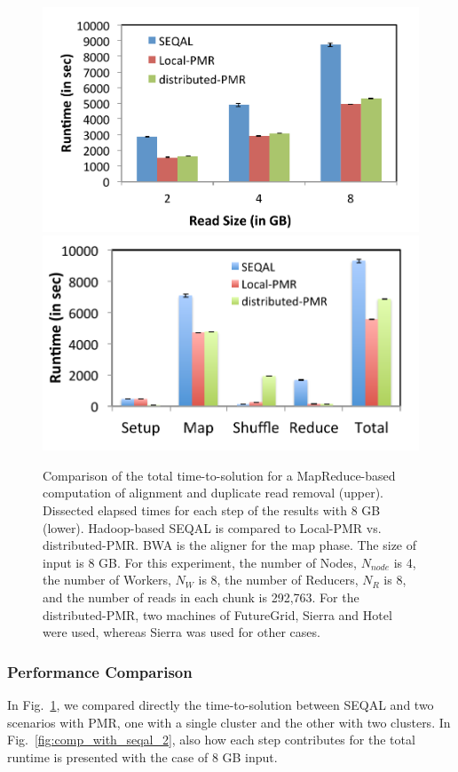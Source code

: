 \documentclass{sig-alternate}
\begin{document}
{\begin{figure}
 \centering
\includegraphics[scale=0.50]{figures/seqalvslocalpmr.pdf}
\includegraphics[scale=0.52]{figures/8GB_phasewisetimes.pdf}

\caption{\small Comparison of the total time-to-solution for a MapReduce-based computation of alignment and duplicate read removal (upper).  Dissected elapsed times for each step of the results with 8 GB (lower). Hadoop-based SEQAL is compared to Local-PMR vs. distributed-PMR.  BWA is the aligner for the map phase.  The size of input is 8 GB.  For this experiment, the number of Nodes, $N_{node}$ is 4, the number of Workers, $N_W$ is 8, the number of Reducers, $N_R$ is 8, and the number of reads in each chunk is 292,763. For the distributed-PMR, two machines of FutureGrid, Sierra and Hotel were used, whereas Sierra was used for other cases.}
  \label{fig:comp_with_seqal_1} 
\end{figure}

\subsubsection{Performance Comparison}
In Fig.~\ref{fig:comp_with_seqal_1}, we compared directly the time-to-solution between SEQAL and two scenarios with PMR, one with a single cluster and the other with two clusters.  In Fig.~\ref{fig:comp_with_seqal_2}, also how each step contributes for the total runtime is presented with the case of 8 GB input.  

}
\end{document}

